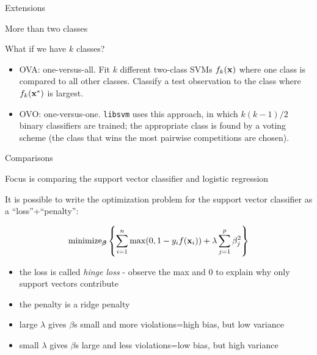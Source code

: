 \documentclass[ignorenonframetext,]{beamer}
\providecommand{\tightlist}{%
  \setlength{\itemsep}{0pt}\setlength{\parskip}{0pt}}
\begin{document}
\begin{frame}[fragile]{Extensions}

\begin{block}{More than two classes}

What if we have \(k\) classes?

\begin{itemize}
\tightlist
\item
  OVA: one-versus-all. Fit \(k\) different two-class SVMs
  \(f_k({\bf x})\) where one class is compared to all other classes.
  Classify a test observation to the class where \(f_k({\bf x}^*)\) is
  largest.
\item
  OVO: one-versus-one. \texttt{libsvm} uses this approach, in which
  \(k(k-1)/2\) binary classifiers are trained; the appropriate class is
  found by a voting scheme (the class that wins the most pairwise
  competitions are chosen).
\end{itemize}

\end{block}

\end{frame}

\begin{frame}{ Comparisons}

Focus is comparing the support vector classifier and logistic regression

It is possible to write the optimization problem for the support vector
classifier as a ``loss''+``penalty'':

\[\text{minimize}_{\boldsymbol \beta} \left\{ \sum_{i=1}^n \max(0,1-y_i f({\bf x}_i))+ \lambda \sum_{j=1}^p \beta_j^2 \right\}\]

\begin{itemize}
\item
  the loss is called \emph{hinge loss} - observe the max and 0 to
  explain why only support vectors contribute
\item
  the penalty is a ridge penalty
\item
  large \(\lambda\) gives \(\beta\)s small and more violations=high
  bias, but low variance
\item
  small \(\lambda\) gives \(\beta\)s large and less violations=low bias,
  but high variance
\end{itemize}

\end{frame}
\end{document}
